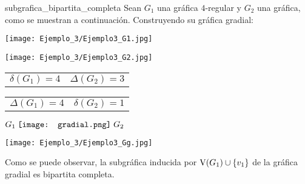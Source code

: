 \documentclass[fleqn, 11pt]{beamer}
\newcommand{\gradial}{\hspace{0.9mm} \texttt{[image: gradial.png]} \hspace{1mm}}
\begin{document}
    \begin{ejemplo}[beforeafter skip = 4mm]{}{subgrafica_bipartita_completa}
        Sean $ G_1 $ una gráfica $ 4 $-regular y $ G_2 $ una gráfica, como se muestran a continuación. Construyendo su gráfica gradial:

        \begin{center}
            \begin{minipage}[h]{0.6\linewidth}
                \begin{minipage}[h]{0.45\linewidth}
                    \texttt{[image: Ejemplo\_3/Ejemplo3\_G1.jpg]}
                \end{minipage} 
                \begin{minipage}[h]{0.45\linewidth}
                    \texttt{[image: Ejemplo\_3/Ejemplo3\_G2.jpg]}
                \end{minipage} 
    
                \begin{minipage}[h]{0.45\linewidth}
                    \begin{tcolorbox}[title empty, colframe = black!99!white, colback = white, sharp corners, hbox, nobeforeafter, left = -0.9mm, right = -0.9mm, top = -0.9mm, bottom = -0.9mm]
                        \begin{tabular}{c|c}
                            \rowcolor{gray!36!white} 
                            $ \delta(G_1) = 4 $ & $ \Delta(G_2) = 3 $
                        \end{tabular}
                    \end{tcolorbox}
                \end{minipage}
                \begin{minipage}[h]{0.45\linewidth}
                    \begin{tcolorbox}[title empty, colframe = black!99!white, colback = white, sharp corners, hbox, nobeforeafter, left = -0.9mm, right = -0.9mm, top = -0.9mm, bottom = -0.9mm]
                        \begin{tabular}{c|c}
                            \rowcolor{gray!36!white} 
                            $ \Delta(G_1) = 4 $ & $ \delta(G_2) = 1 $
                        \end{tabular}
                    \end{tcolorbox}
                \end{minipage}
            \end{minipage}
            \begin{minipage}[h]{0.25\linewidth}
                \centering
                
                $ G_1 \gradial G_2 $

                \texttt{[image: Ejemplo\_3/Ejemplo3\_Gg.jpg]}
            \end{minipage}
        \end{center} \vspace{3mm}

        Como se puede observar, la subgráfica inducida por $ \textnormal{V}(G_1) \cup \lbrace v_1 \rbrace $ de la gráfica gradial es bipartita completa.
    \end{ejemplo}
\end{document}
